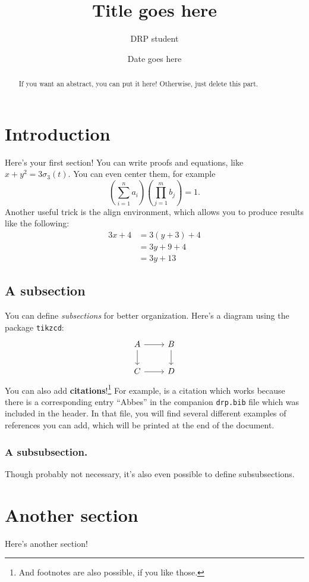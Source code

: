 \documentclass[12pt]{amsart}
\title{Title goes here}
\author{DRP student}
\date{Date goes here}
\theoremstyle{definition}
\numberwithin{equation}{section}
\begin{document}
\maketitle

\begin{abstract}
	If you want an abstract, you can put it here! Otherwise, just delete this part.
\end{abstract}

\tableofcontents

\section{Introduction}

Here's your first section! You can write proofs and equations, like $x+y^2=3\sigma_3(t)$. You can even center them, for example
\[
\left( \sum_{i=1}^n a_i \right)\left(\prod_{j=1}^m b_j\right) = 1.
\]
Another useful trick is the align environment, which allows you to produce results like the following:
\begin{align}
3x+4 & = 3(y+3)+4 \\
& = 3y + 9 +4 \\
& = 3y + 13
\end{align}

\subsection{A subsection}

You can define \emph{subsections} for better organization. Here's a diagram using the package \texttt{tikzcd}:
\[
\begin{tikzcd}
A \arrow[r] \arrow[d] & B \arrow[d]\\
C \arrow[r] & D
\end{tikzcd}
\]
You can also add \textbf{citations}!\footnote{And footnotes are also possible, if you like those.} For example, \cite[\S 15]{Abbes} is a citation which works because there is a corresponding entry ``Abbes'' in the companion \texttt{drp.bib} file which was included in the header. In that file, you will find several different examples of references you can add, which will be printed at the end of the document.

\subsubsection{A subsubsection.}

Though probably not necessary, it's also even possible to define subsubsections.

\section{Another section}

Here's another section!

\printbibliography
\end{document}

